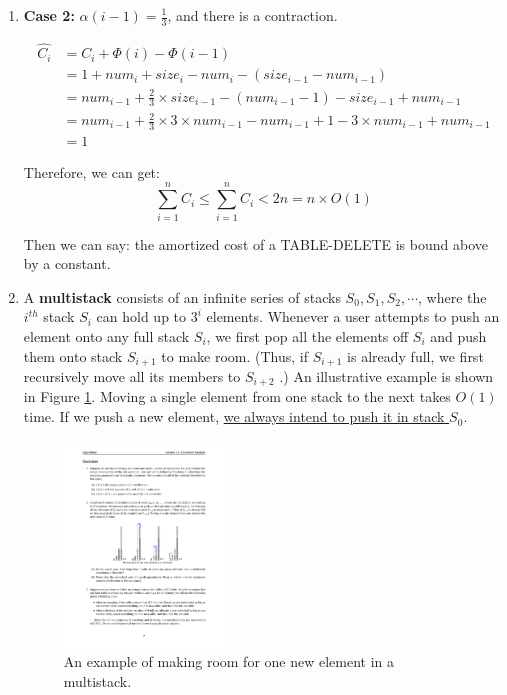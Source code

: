 \documentclass[12pt,a4paper]{article}
\makeatletter
\newtheorem*{solution}{Solution}
\theoremstyle{definition}
\renewenvironment{solution}[1][Solution] {\par\pushQED{\qed}\normalfont\topsep6\p@\@plus6\p@\relax\trivlist\item[\hskip\labelsep\bfseries#1\@addpunct{.}]\ignorespaces}{\popQED\endtrivlist\@endpefalse} \makeatother
\makeatother
\begin{document}
\begin{enumerate}
\begin{solution}
		  \textbf{Case 2:} $\alpha(i-1)=\frac{1}{3}$, and there is a contraction.
		 
		 
		 \begin{equation}\nonumber
		 \begin{aligned}
		 \widehat{C_i}&=C_i+\Phi(i)-\Phi(i-1)
		 \\&=1+num_i+ size_i-num_i-(size_{i-1}-num_{i-1})
		 \\&=num_{i-1}+\frac{2}{3}\times size_{i-1}-(num_{i-1}-1)-size_{i-1}+num_{i-1}
		 \\&=num_{i-1}+\frac{2}{3}\times 3\times num_{i-1}-num_{i-1}+1-3\times num_{i-1}+num_{i-1}
		 \\&=1
		 \end{aligned}
		 \end{equation}
		
		Therefore, we can get:
		$$\sum_{i=1}^{n}{C_i}\leq  \sum_{i=1}^{n}\widehat{C_i}<2n=n\times O(1) $$				
		
		Then we can say: the amortized cost of a TABLE-DELETE is bound above by a constant.
		
	\end{solution}
	

	
	\item A \textbf{multistack} consists of an infinite series of stacks $S_0, S_1, S_2,\cdots$, where the $i^{th}$ stack $S_i$ can hold up to $3^i$ elements. Whenever a user attempts to push an element onto any full stack $S_i$, we first pop all the elements off $S_i$ and push them onto stack $S_{i+1}$ to make room. (Thus, if $S_{i+1}$ is already full, we first recursively move all its members to $S_{i+2}$ .) An illustrative example is shown in Figure \ref{Fig-MultiStack}. Moving a single element from one stack to the next takes $O(1)$ time. If we push a new element, \underline{we always intend to push it in stack $S_0$}.

	\begin{figure}[!htbp]
	\centering
	\includegraphics[width=0.4\textwidth]{Fig-MultiStack.pdf}
	\caption{An example of making room for one new element in a multistack.}
	\label{Fig-MultiStack}
	\end{figure}


\end{enumerate}
\end{document}

